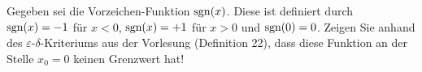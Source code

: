 \item Gegeben sei die Vorzeichen-Funktion $\text{sgn}(x)$. Diese ist definiert durch $\text{sgn}(x)=-1$ für $x<0$, $\text{sgn}(x)=+1$ für $x>0$ und $\text{sgn}(0) = 0$. Zeigen Sie anhand des $\varepsilon$-$\delta$-Kriteriums aus der Vorlesung (Definition 22), dass diese Funktion an der Stelle $x_0=0$ keinen Grenzwert hat!
